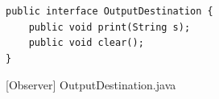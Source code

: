 \begin{figure}[htb]
\centering
\lstset{language=Java, basicstyle=\scriptsize, stepnumber=1, showspaces=false, showstringspaces=false,breaklines=true}
\begin{lstlisting}
public interface OutputDestination {
	public void print(String s);
	public void clear();
}
\end{lstlisting}
\caption{[Observer] OutputDestination.java}
\label{fig:OutputDestination}
\end{figure}
\FloatBarrier



